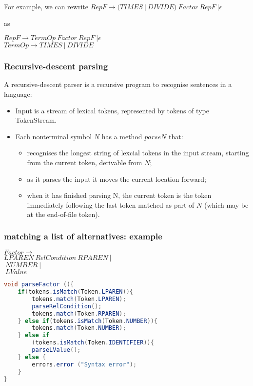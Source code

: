 For example, we can rewrite
$RepF \rightarrow (TIMES \ | \ DIVIDE) \ Factor \ RepF \ | \epsilon$

as 

$RepF \rightarrow TermOp \ Factor \ RepF \ | \epsilon$ \\
$TermOp \rightarrow TIMES \ | \ DIVIDE$

\subsubsection{Recursive-descent parsing}
A recursive-descent parser is a recursive program to recognise sentences in a language:
\begin{itemize}
    \item Input is a stream of lexical tokens, represented by tokens of type TokenStream. 
    \item Each nonterminal symbol $N$ has a method $parseN$ that:
    \begin{itemize}
        \item recognises the longest string of lexcial tokens in the input stream, starting from the current token, derivable from $N$;
        \item as it parses the input it moves the current location forward;
        \item when it has finished parsing N, the current token is the token immediately following the last token matched as part of $N$ (which may be at the end-of-file token).
    \end{itemize}
\end{itemize}

\subsubsection{matching a list of alternatives: example}
\begin{scriptsize}
$Factor \rightarrow \ $ \\ 
$LPAREN \ RelCondition \ RPAREN \ |$ \\
$\ NUMBER \ |$ \\
$\ LValue $
\begin{lstlisting}[language=Java]
void parseFactor (){
    if(tokens.isMatch(Token.LPAREN)){
        tokens.match(Token.LPAREN);
        parseRelCondition();
        tokens.match(Token.RPAREN);
    } else if(tokens.isMatch(Token.NUMBER)){
        tokens.match(Token.NUMBER);
    } else if
        (tokens.isMatch(Token.IDENTIFIER)){
        parseLValue();
    } else {
        errors.error ("Syntax error");
    }
}
\end{lstlisting}
\end{scriptsize}

